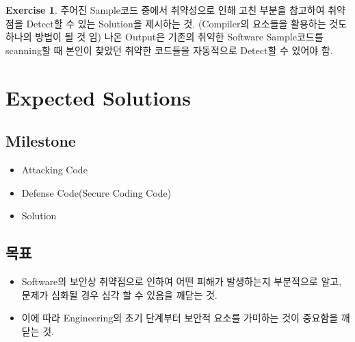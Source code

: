 \documentclass[a4paper, 11pt]{article}
\theoremstyle{definition}
\newtheorem{exercise}{Exercise}
\begin{document}
\begin{exercise}

  주어진 Sample코드 중에서 취약성으로 인해 고친 부분을 참고하여 취약점을 Detect할 수 있는 Solution을 제시하는 것. (Compiler의 요소들을 활용하는 것도 하나의 방법이 될 것 임) 나온 Output은 기존의 취약한 Software Sample코드를 scanning할 때 본인이 찾았던 취약한 코드들을 자동적으로 Detect할 수 있어야 함. 

\end{exercise}

\section{Expected Solutions}
  \subsection{Milestone}
   \begin{itemize}
      \item Attacking Code
      \item Defense Code(Secure Coding Code)
	  \item Solution
   \end{itemize}
  \subsection{목표}
   \begin{itemize}
      \item Software의 보안상 취약점으로 인하여 어떤 피해가 발생하는지 부분적으로 알고, 문제가 심화될 경우 심각 할 수 있음을 깨닫는 것.
      \item 이에 따라 Engineering의 초기 단계부터 보안적 요소를 가미하는 것이 중요함을 깨닫는 것.
   \end{itemize}



\end{document}
